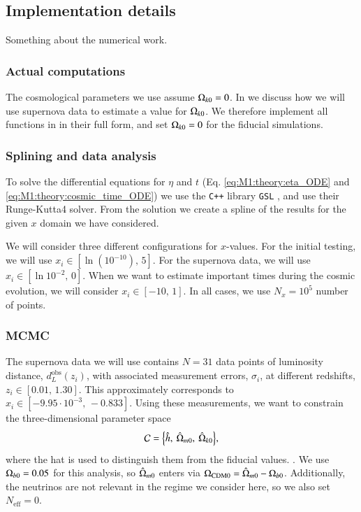 
\subsection{Implementation details}\label{ssec:M1:implementations} 
Something about the numerical work.

\subsubsection{Actual computations }
The cosmological parameters we use assume $\Omega_{k0}=0$. In  we discuss how we will use supernova data to estimate a value for $\Omega_{k0}$. We therefore implement all functions in  in their full form, and set $\Omega_{k0}=0$ for the fiducial simulations.  

\subsubsection{Splining and data analysis }
To solve the differential equations for $\eta$ and $t$ (Eq. \eqref{eq:M1:theory:eta_ODE} and \eqref{eq:M1:theory:cosmic_time_ODE}) we use the \texttt{C++} library \texttt{GSL} \cite{gough2009gnu}, and use their Runge-Kutta4 solver. From the solution we create a spline of the results for the given $x$ domain we have considered. 

We will consider three different configurations for $x$-values. For the initial testing, we will use $x_i\in[\ln(10^{-10}),\,5]$. For the supernova data, we will use $x_i\in[\ln 10^{-2},\,0]$. When we want to estimate important times during the cosmic evolution, we will consider $x_i\in[-10,\,1]$. In all cases, we use $N_x=10^5$ number of points.  



\subsubsection{MCMC }\label{sssec:M1:implementations:supernova_fitting}
The supernova data we will use contains $N=31$ data points of luminosity distance, $d_L^\mathrm{obs}(z_i)$, with associated measurement errors, $\sigma_i$, at different redshifts, $z_i\in[0.01,\,1.30]$. This approximately corresponds to $x_i\in[-9.95\cdot 10^{-3},\,-0.833]$. Using these measurements, we want to constrain the three-dimensional parameter space 
\begin{equation}
    \mathcal{C} = \Big\{ \hat{h},\: \hat{\Omega}_{m0},\: \hat{\Omega}_{k0} \Big\}, \label{eq:M1:implementations:supernova_parameter_space}
\end{equation}  
where the hat is used to distinguish them from the fiducial values. . We use $\Omega_{b0}=0.05$ for this analysis, so $\hat{\Omega}_{m0}$ enters via $\Omega_\mathrm{CDM0}=\hat{\Omega}_{m0}-\Omega_{b0}$. Additionally, the neutrinos are not relevant in the regime we consider here, so we also set $N_\mathrm{eff}=0$.  


